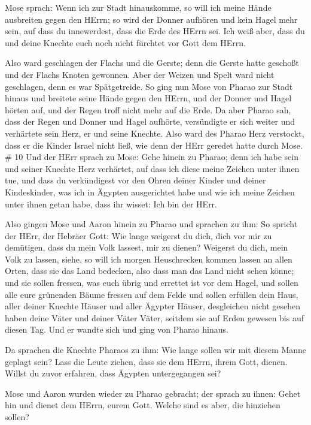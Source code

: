  Mose sprach: Wenn ich zur Stadt hinauskomme, so will ich
meine Hände ausbreiten gegen den HErrn; so wird der Donner aufhören und
kein Hagel mehr sein, auf dass du innewerdest, dass die Erde des HErrn
sei.  Ich weiß aber, dass du und deine Knechte euch noch
nicht fürchtet vor Gott dem HErrn.

 Also ward geschlagen der Flachs und die Gerste; denn die
Gerste hatte geschoßt und der Flachs Knoten gewonnen.  Aber
der Weizen und Spelt ward nicht geschlagen, denn es war Spätgetreide.
 So ging nun Mose von Pharao zur Stadt hinaus und breitete
seine Hände gegen den HErrn, und der Donner und Hagel hörten auf, und
der Regen troff nicht mehr auf die Erde.  Da aber Pharao
sah, dass der Regen und Donner und Hagel aufhörte, versündigte er sich
weiter und verhärtete sein Herz, er und seine Knechte. 
Also ward des Pharao Herz verstockt, dass er die Kinder Israel nicht
ließ, wie denn der HErr geredet hatte durch Mose. \# 10  Und
der HErr sprach zu Mose: Gehe hinein zu Pharao; denn ich habe sein und
seiner Knechte Herz verhärtet, auf dass ich diese meine Zeichen unter
ihnen tue,  und dass du verkündigest vor den Ohren deiner
Kinder und deiner Kindeskinder, was ich in Ägypten ausgerichtet habe und
wie ich meine Zeichen unter ihnen getan habe, dass ihr wisset: Ich bin
der HErr.

 Also gingen Mose und Aaron hinein zu Pharao und sprachen zu
ihm: So spricht der HErr, der Hebräer Gott: Wie lange weigerst du dich,
dich vor mir zu demütigen, dass du mein Volk lassest, mir zu dienen?
 Weigerst du dich, mein Volk zu lassen, siehe, so will ich
morgen Heuschrecken kommen lassen an allen Orten,  dass sie
das Land bedecken, also dass man das Land nicht sehen könne; und sie
sollen fressen, was euch übrig und errettet ist vor dem Hagel, und
sollen alle eure grünenden Bäume fressen auf dem Felde  und
sollen erfüllen dein Haus, aller deiner Knechte Häuser und aller Ägypter
Häuser, desgleichen nicht gesehen haben deine Väter und deiner Väter
Väter, seitdem sie auf Erden gewesen bis auf diesen Tag. Und er wandte
sich und ging von Pharao hinaus.

 Da sprachen die Knechte Pharaos zu ihm: Wie lange sollen
wir mit diesem Manne geplagt sein? Lass die Leute ziehen, dass sie dem
HErrn, ihrem Gott, dienen. Willst du zuvor erfahren, dass Ägypten
untergegangen sei?

 Mose und Aaron wurden wieder zu Pharao gebracht; der sprach
zu ihnen: Gehet hin und dienet dem HErrn, eurem Gott. Welche sind es
aber, die hinziehen sollen?

